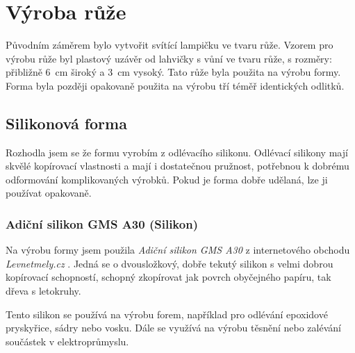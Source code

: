 \chapter{Výroba růže}
Původním záměrem bylo vytvořit svítící lampičku ve tvaru růže. Vzorem pro výrobu růže byl plastový uzávěr od lahvičky s vůní ve tvaru růže, s rozměry: přibližně 6~cm široký a 3~cm vysoký. Tato růže byla použita na výrobu formy. Forma byla později opakovaně použita na výrobu tří téměř identických odlitků.



\section{Silikonová forma}

Rozhodla jsem se že formu vyrobím z odlévacího silikonu. Odlévací silikony mají skvělé kopírovací vlastnosti a mají i dostatečnou pružnost, potřebnou k dobrému odformování komplikovaných výrobků. Pokud je forma dobře udělaná, lze ji používat opakovaně.



\begin{figure}[htbp]
	\centering
\end{figure}
 


\subsection*{Adiční silikon GMS A30 (Silikon)}

Na výrobu formy jsem použila \textit{Adiční silikon GMS A30}  \cite{silikon} z internetového obchodu \textit{Levnetmely.cz}  \cite{tmely}. Jedná se o dvousložkový, dobře tekutý silikon s velmi dobrou kopírovací schopností, schopný zkopírovat jak povrch obyčejného papíru, tak dřeva s letokruhy.

Tento silikon se používá na výrobu forem, například pro odlévání epoxidové pryskyřice, sádry nebo vosku. Dále se využívá na výrobu těsnění nebo zalévání součástek v elektroprůmyslu.


